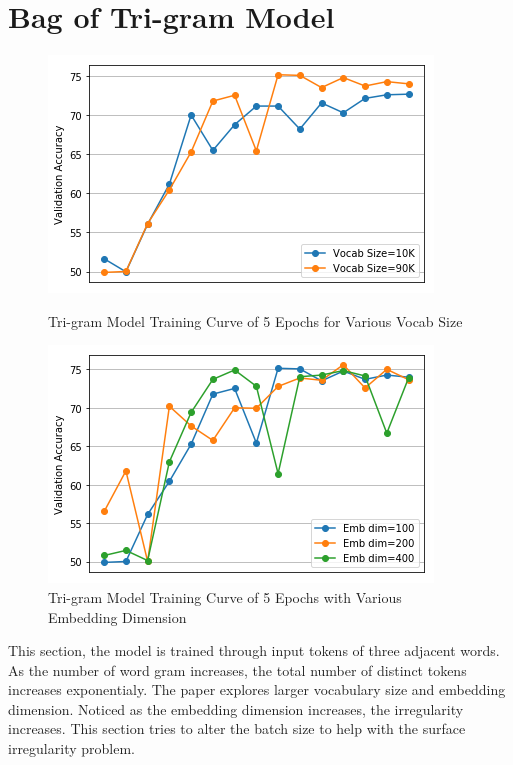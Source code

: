 \documentclass[10pt]{article}
\begin{document}
\section{Bag of Tri-gram Model}
\begin{figure}[h]
\centering
\begin{minipage}{.4\textwidth}
  \includegraphics[width=\textwidth]{plot8}
  \caption{Tri-gram Model Training Curve of 5 Epochs for Various Vocab Size}
\end{minipage}%
\hfill
\begin{minipage}{.4\textwidth}
  \includegraphics[width=\textwidth]{plot9}
  \caption{Tri-gram Model Training Curve of 5 Epochs with Various Embedding Dimension}
\end{minipage}
\end{figure}
This section, the model is trained through input tokens of three adjacent words. As the number of word gram increases, the total number of distinct tokens increases exponentialy.  The paper explores larger vocabulary size and embedding dimension. Noticed as the embedding dimension increases, the irregularity increases. This section tries to alter the batch size to help with the surface irregularity problem.
\end{document}

